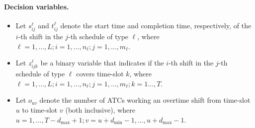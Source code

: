 \documentclass[11pt]{article}
\begin{document}
\paragraph{Decision variables.} 
\begin{itemize}
\item Let $s_{ij}^\ell$ and $t_{ij}^\ell$ denote the start time and completion time, respectively, of the $i$-th shift in the $j$-th schedule of type $\ell$, where $\ell = 1,\ldots, L; i = 1,\ldots,n_\ell; j=1,\ldots,m_\ell$. 
\item Let $z_{ijk}^\ell$ be a binary  variable that indicates if the $i$-th shift in the $j$-th schedule of type $\ell$ covers time-slot $k$, where $\ell = 1,\ldots, L; i = 1,\ldots,n_\ell; j=1,\ldots,m_\ell; k=1\ldots,T$.
\item Let $o_{uv}$ denote the number of ATCs working an overtime shift from time-slot $u$ to time-slot $v$ (both inclusive), where $u= 1,\ldots, T-d_{\max}+1; v =  u+d_{\min}-1, \ldots, u+d_{\max}-1$.
\end{itemize}
\end{document}
